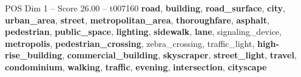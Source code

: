 \begin{textsample}{POS Dim 1 – Score 26.00 – t007160}  \label{ex:f1_pos_006}
\textbf{road}, \textbf{building}, \textbf{road\_surface}, \textbf{city}, \textbf{urban\_area}, \textbf{street}, \textbf{metropolitan\_area}, \textbf{thoroughfare}, \textbf{asphalt}, \textbf{pedestrian}, \textbf{public\_space}, \textbf{lighting}, \textbf{sidewalk}, \textbf{lane}, signaling\_device, \textbf{metropolis}, \textbf{pedestrian\_crossing}, zebra\_crossing, traffic\_light, \textbf{high-rise\_building}, \textbf{commercial\_building}, \textbf{skyscraper}, \textbf{street\_light}, \textbf{travel}, \textbf{condominium}, \textbf{walking}, \textbf{traffic}, \textbf{evening}, \textbf{intersection}, \textbf{cityscape}

\end{textsample}
